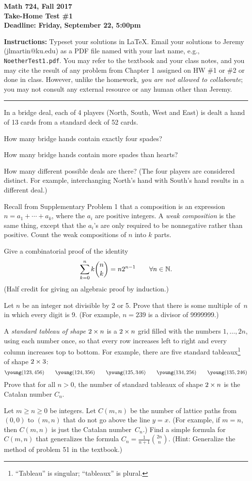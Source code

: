 

\thispagestyle{empty}

\textbf{Math 724, Fall 2017\\
Take-Home Test \#1\\
Deadline: Friday, September 22, 5:00pm}

\textbf{Instructions:} Typeset your solutions in LaTeX.  Email your solutions to Jeremy (jlmartin@ku.edu) as a PDF file named with your last name, e.g., {\tt NoetherTest1.pdf}.  You may refer to the textbook and your class notes, and you may cite the result of any problem from Chapter 1 assigned on HW \#1 or \#2 or done in class.  However, unlike the homework, \emph{you are not allowed to collaborate};
you may not consult any external resource or any human other than Jeremy.
\medskip\hrule

\prob
In a bridge deal, each of 4 players (North, South, West and East) is dealt a hand of 13 cards from a standard deck of 52 cards.  

How many bridge hands contain exactly four spades?

How many bridge hands contain more spades than hearts?

How many different possible deals are there?  (The four players are considered distinct.  For example, interchanging North's hand with South's hand results in a different deal.)

Recall from Supplementary Problem 1 that a composition is an expression $n=a_1+\cdots+a_k$,
where the $a_i$ are positive integers.  A \emph{weak composition}
is the same thing, except that the $a_i$'s are only required to be
nonnegative rather than positive.
Count the weak compositions of $n$ into $k$ parts.

Give a combinatorial proof of the identity
\[\sum_{k=0}^n k\binom{n}{k} = n2^{n-1} \qquad \forall n\in\mathbb{N}.\]
(Half credit for giving an algebraic proof by induction.)

Let $n$ be an integer not divisible by 2 or 5.  Prove that there is some
multiple of~$n$ in which every digit is 9.  (For example, $n=239$ is a divisor of 9999999.)

A \emph{standard tableau of shape $2\times n$} is a $2\times n$ grid filled with the numbers
$1,\dots,2n$, using each number once, so that every row increases left to right and every column increases top to bottom.  For example, there are five standard tableaux\footnote{``Tableau'' is singular; ``tableaux'' is plural.} of shape $2\times3$:
\[\young(123,456)\qquad
\young(124,356)\qquad
\young(125,346)\qquad
\young(134,256)\qquad
\young(135,246)\]
Prove that for all $n>0$, the number of standard tableaux of shape $2\times n$
is the Catalan number $C_n$.

Let $m\geq n\geq 0$ be integers.  Let $C(m,n)$ be the number of lattice
paths from $(0,0)$ to $(m,n)$ that do not go above the line $y=x$.  (For example, if $m=n$, then $C(m,n)$ is just the Catalan number~$C_n$.)  Find a simple formula for $C(m,n)$ that generalizes the formula $C_n=\frac{1}{n+1}\binom{2n}{n}$.  (Hint: Generalize the method of problem 51 in the textbook.)


